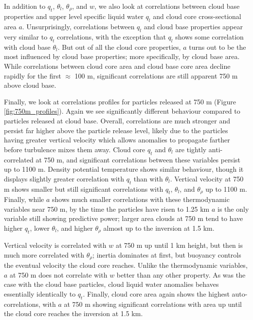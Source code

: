 \documentclass[acp]{copernicus}
\begin{document}
In addition to $q_t$, $\theta_l$, $\theta_\rho$, and $w$, we also look at 
correlations between cloud base properties and upper level specific liquid 
water $q_l$ and cloud core cross-sectional area $a$.  Unsurprisingly, 
correlations between $q_l$ and cloud base properties appear very similar to 
$q_t$ correlations, with the exception that $q_l$ shows some correlation with 
cloud base $\theta_l$.  But out of all the cloud core properties, $a$ turns 
out to be the most influenced by cloud base properties; more specifically, by 
cloud base area.  While correlations between cloud core area and cloud base 
core area decline rapidly for the first $\approx$ 100 m, significant 
correlations are still apparent 750 m above cloud base.

Finally, we look at correlations profiles for particles released at 750 m 
(Figure \ref{fig:750m_profiles}).  Again we see significantly different 
behaviour compared to particles released at cloud base.  Overall, correlations 
are much stronger and persist far higher above the particle release level, 
likely due to the particles having greater vertical velocity which allows 
anomalies to propagate farther before turbulence mixes them away.  Cloud core 
$q_t$ and $\theta_l$ are tightly anti-correlated at 750 m, and significant 
correlations between these variables persist up to 1100 m.  Density potential 
temperature shows similar behaviour, though it displays slightly greater 
correlation with $q_t$ than with $\theta_l$.  Vertical velocity at 750 m shows 
smaller but still significant correlations with $q_t$, $\theta_l$, and 
$\theta_\rho$ up to 1100 m.  Finally, while $a$ shows much smaller 
correlations with these thermodynamic variables near 750 m, by the time the 
particles have risen to 1.25 km $a$ is the only variable still showing 
predictive power; larger area clouds at 750 m tend to have higher $q_t$, lower 
$\theta_l$, and higher $\theta_\rho$ almost up to the inversion at 1.5 km.

Vertical velocity is correlated with $w$ at 750 m up until 1 km height, but 
then is much more correlated with $\theta_\rho$; inertia dominates at first,
but buoyancy controls the eventual velocity the cloud core reaches.  Unlike 
the thermodynamic variables, $a$ at 750 m does not correlate with $w$ 
better than any other property.  As was the case with the cloud base particles, 
cloud liquid water anomalies behaves essentially identically to $q_t$. Finally, 
cloud core area again shows the highest auto-correlations, with $a$ at 750 m 
showing significant correlations with area up until the cloud core reaches the 
inversion at 1.5 km.
\end{document}
